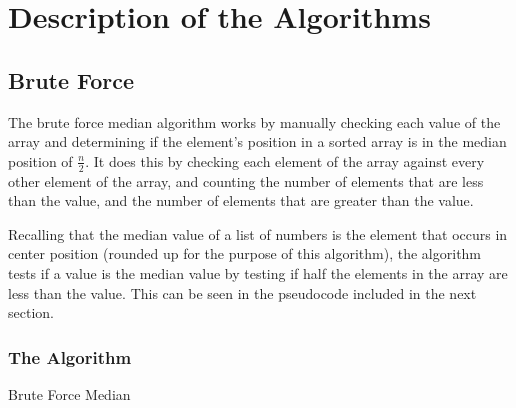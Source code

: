 \documentclass{article}
\begin{document}
\section{Description of the Algorithms}
    \subsection{Brute Force}
        The brute force median algorithm works by manually checking each value of the array and determining if the element's position in a sorted array is in the median position of $\frac{n}{2}$. It does this by checking each element of the array against every other element of the array, and counting the number of elements that are less than the value, and the number of elements that are greater than the value.

        Recalling that the median value of a list of numbers is the element that occurs in center position (rounded up for the purpose of this algorithm), the algorithm tests if a value is the median value by testing if half the elements in the array are less than the value. This can be seen in the pseudocode included in the next section.

        \subsubsection{The Algorithm}
            \begin{algorithm}[H]
                \caption{Brute Force Median}
                \begin{algorithmic}[1]
                                \Else
                                    \EndIf
                                \EndIf
                            \EndFor
                            \EndIf
                        \EndFor
                    \EndFunction
                \end{algorithmic}
            \end{algorithm}
\end{document}
